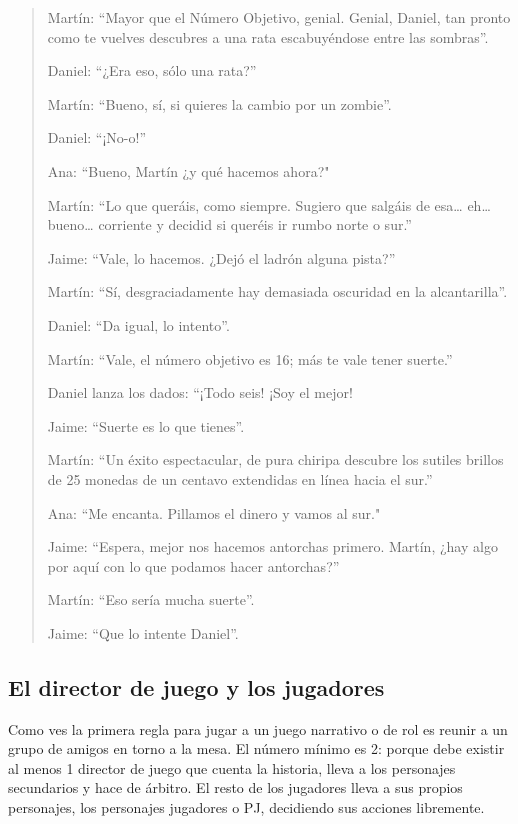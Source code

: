 \begin{quotation}
Martín: “Mayor que el Número Objetivo, genial. Genial, Daniel, tan pronto como te vuelves descubres a una rata escabuyéndose entre las sombras”.

Daniel: “¿Era eso, sólo una rata?”

Martín: “Bueno, sí, si quieres la cambio por un zombie”.

Daniel: “¡No-o!”

Ana: “Bueno, Martín ¿y qué hacemos ahora?"

Martín: “Lo que queráis, como siempre. Sugiero que salgáis de esa… eh… bueno… corriente y decidid si queréis ir rumbo norte o sur.”

Jaime: “Vale, lo hacemos. ¿Dejó el ladrón alguna pista?”

Martín: “Sí, desgraciadamente hay demasiada oscuridad en la alcantarilla”.

Daniel: “Da igual, lo intento”.

Martín: “Vale, el número objetivo es 16; más te vale tener suerte.”

Daniel lanza los dados: “¡Todo seis! ¡Soy el mejor!

Jaime: “Suerte es lo que tienes”.

Martín: “Un éxito espectacular, de pura chiripa descubre los sutiles brillos de 25 monedas de un centavo extendidas en línea hacia el sur.”

Ana: “Me encanta. Pillamos el dinero y vamos al sur."

Jaime: “Espera, mejor nos hacemos antorchas primero. Martín, ¿hay algo por aquí con lo que podamos hacer antorchas?”

Martín: “Eso sería mucha suerte”.

Jaime: “Que lo intente Daniel”.

\end{quotation}

\subsection{El director de juego y los jugadores}

Como ves la primera regla para jugar a un juego narrativo o de rol es reunir a un grupo de amigos en torno a la mesa. El número mínimo es 2: porque debe existir al menos 1 director de juego que cuenta la historia, lleva a los personajes secundarios y hace de árbitro. El resto de los jugadores lleva a sus propios personajes, los personajes jugadores o PJ, decidiendo sus acciones libremente.

